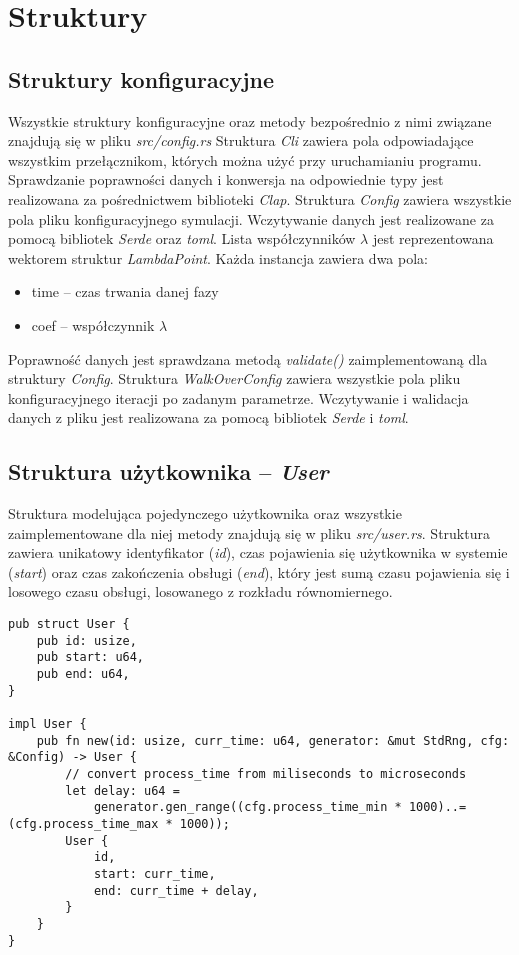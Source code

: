 \section{Struktury}
\subsection{Struktury konfiguracyjne}
Wszystkie struktury konfiguracyjne oraz metody bezpośrednio z nimi związane znajdują się w pliku \emph{src/config.rs}
\newline\newline
\noindent Struktura \emph{Cli} zawiera pola odpowiadające wszystkim przełącznikom, których można użyć przy uruchamianiu programu. Sprawdzanie poprawności danych i konwersja na odpowiednie typy jest realizowana za pośrednictwem biblioteki \emph{Clap}.
\newline\newline
\noindent Struktura \emph{Config} zawiera wszystkie pola pliku konfiguracyjnego symulacji. Wczytywanie danych jest realizowane za pomocą bibliotek \emph{Serde} oraz \emph{toml}. Lista współczynników $\lambda$ jest reprezentowana wektorem struktur \emph{LambdaPoint}. Każda instancja zawiera dwa pola:
\begin{itemize}
\item time -- czas trwania danej fazy
\item coef -- współczynnik $\lambda$
\end{itemize}
\noindent Poprawność danych jest sprawdzana metodą \emph{validate()} zaimplementowaną dla struktury \emph{Config}.
\newline\newline
\noindent Struktura \emph{WalkOverConfig} zawiera wszystkie pola pliku konfiguracyjnego iteracji po zadanym parametrze. Wczytywanie i walidacja danych z pliku jest realizowana za pomocą bibliotek \emph{Serde} i \emph{toml}.


\subsection{Struktura użytkownika -- \emph{User}}
Struktura modelująca pojedynczego użytkownika oraz wszystkie zaimplementowane dla niej metody znajdują się w pliku \emph{src/user.rs}. Struktura zawiera unikatowy identyfikator (\emph{id}), czas pojawienia się użytkownika w systemie (\emph{start}) oraz czas zakończenia obsługi (\emph{end}), który jest sumą czasu pojawienia się i losowego czasu obsługi, losowanego z rozkładu równomiernego.
{
\selectfont 
\begin{verbatim}
pub struct User {
    pub id: usize,
    pub start: u64,
    pub end: u64,
}

impl User {
    pub fn new(id: usize, curr_time: u64, generator: &mut StdRng, cfg: &Config) -> User {
        // convert process_time from miliseconds to microseconds
        let delay: u64 =
            generator.gen_range((cfg.process_time_min * 1000)..=(cfg.process_time_max * 1000));
        User {
            id,
            start: curr_time,
            end: curr_time + delay,
        }
    }
}
\end{verbatim}
}

